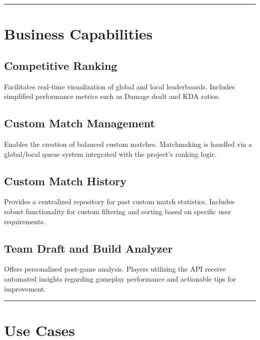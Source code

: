 \documentclass[11pt,a4paper]{article}
\begin{document}
 \vspace{1cm}
 \hrule
 \vspace{1cm}

 \section{Business Capabilities}

 \subsection{Competitive Ranking}
 
 Facilitates real-time visualization of global and local leaderboards. Includes simplified performance metrics such as Damage dealt and KDA ratios.
 
 \subsection{Custom Match Management}
 
 Enables the creation of balanced custom matches. Matchmaking is handled via a global/local queue system integrated with the project's ranking logic.
 
 \subsection{Custom Match History}
 
 Provides a centralized repository for past custom match statistics. Includes robust functionality for custom filtering and sorting based on specific user requirements.
 
 \subsection{Team Draft and Build Analyzer}
 
 Offers personalized post-game analysis. Players utilizing the API receive automated insights regarding gameplay performance and actionable tips for improvement.

 \vspace{1cm}
 \hrule
 \vspace{1cm}

 \section{Use Cases}
\end{document}
